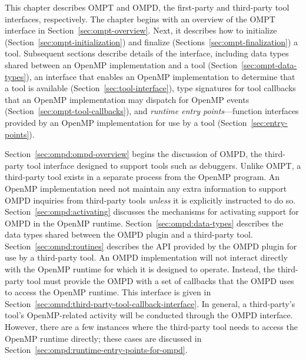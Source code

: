 

This chapter describes OMPT and OMPD, the first-party and third-party
tool interfaces, respectively.
The chapter begins with an overview
of the OMPT interface in Section~\ref{sec:ompt-overview}.
Next, it describes how to initialize (Section~\ref{sec:ompt-initialization})
and finalize (Sections~\ref{sec:ompt-finalization}) a tool.
Subsequent sections describe details of the interface, including
data types shared between an OpenMP implementation and a tool
(Section~\ref{sec:ompt-data-types}), 
an interface that enables an OpenMP implementation to determine that a
tool is available (Section~\ref{sec:tool-interface}),
type signatures for tool callbacks 
that an OpenMP implementation may dispatch for OpenMP events
(Section~\ref{sec:ompt-tool-callbacks}), and 
\emph{runtime entry points}---function interfaces
provided by an OpenMP implementation for use by a tool
(Section~\ref{sec:entry-points}). 

Section~\ref{sec:ompd:ompd-overview} begins the discussion of
OMPD, the third-party tool interface designed to support tools such as debuggers. 
Unlike OMPT, a third-party tool exists in a separate process from 
the OpenMP program.
An OpenMP implementation need not maintain any extra information to support OMPD inquiries from third-party tools
\emph{unless} it is explicitly instructed to do so.
Section~\ref{sec:ompd:activating} discusses the mechanisms for
activating support for OMPD in the OpenMP runtime.
Section~\ref{sec:ompd:data-types}  describes the data types shared between the OMPD plugin and a third-party tool.
Section~\ref{sec:ompd:routines} describes the API provided by the OMPD plugin for use by a third-party tool. 
An OMPD implementation will not interact directly with the OpenMP
runtime for which it is designed to operate.
Instead, the third-party tool must provide the OMPD with a set of
callbacks that the OMPD uses to access the OpenMP runtime.
This interface is given in
Section~\ref{sec:ompd:third-party-tool-callback-interface}.
In general, a third-party's tool's OpenMP-related activity will be
conducted through the OMPD interface.
However, there are a few instances where the third-party tool needs
to access the OpenMP runtime directly;
these cases are discussed in
Section~\ref{sec:ompd:runtime-entry-points-for-ompd}.









